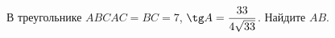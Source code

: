 \begin{ex}
	\begin{condition}
		В треугольнике \(ABC AC=BC=7\),  \( \tg A=\dfrac{33}{4\sqrt{33}} \).  Найдите \( AB \).
	\end{condition}
\end{ex}